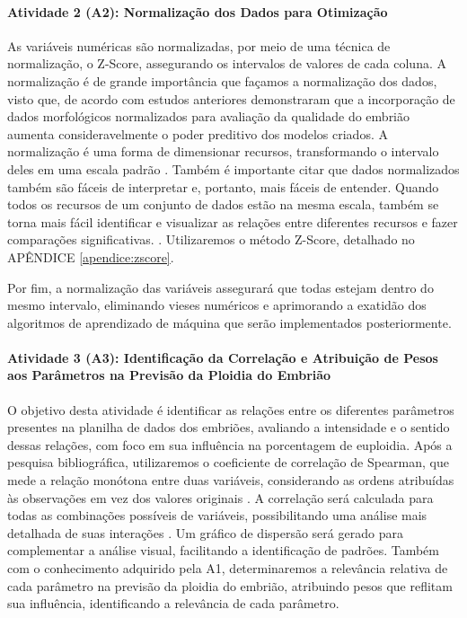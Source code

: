 \paragraph{\textbf{Atividade 2 (A2):} Normalização dos Dados para Otimização}

As variáveis numéricas são normalizadas, por meio de uma técnica de normalização, o Z-Score, assegurando os intervalos de valores de cada coluna. A normalização é de grande importância que façamos a normalização dos dados, visto que, de acordo com  estudos anteriores demonstraram que a incorporação de dados morfológicos normalizados para avaliação da qualidade do embrião aumenta consideravelmente o poder preditivo dos modelos criados. A normalização é uma forma de dimensionar recursos, transformando o intervalo deles em uma escala padrão \cite{jaiswal2024}. Também é importante citar que dados normalizados também são fáceis de interpretar e, portanto, mais fáceis de entender. Quando todos os recursos de um conjunto de dados estão na mesma escala, também se torna mais fácil identificar e visualizar as relações entre diferentes recursos e fazer comparações significativas. \cite{jaiswal2024}. Utilizaremos o método Z-Score, detalhado no APÊNDICE \ref{apendice:zscore}.

Por fim, a normalização das variáveis assegurará que todas estejam dentro do mesmo intervalo, eliminando vieses numéricos e aprimorando a exatidão dos algoritmos de aprendizado de máquina que serão implementados posteriormente.

\paragraph{\textbf{Atividade 3 (A3):} Identificação da Correlação e Atribuição de Pesos aos Parâmetros na Previsão da Ploidia do Embrião}

O objetivo desta atividade é identificar as relações entre os diferentes parâmetros presentes na planilha de dados dos embriões, avaliando a intensidade e o sentido dessas relações, com foco em sua influência na porcentagem de euploidia. Após a pesquisa bibliográfica, utilizaremos o coeficiente de correlação de Spearman, que mede a relação monótona entre duas variáveis, considerando as ordens atribuídas às observações em vez dos valores originais \cite{sousa2019}. A correlação será calculada para todas as combinações possíveis de variáveis, possibilitando uma análise mais detalhada de suas interações \cite{sousa2019}. Um gráfico de dispersão será gerado para complementar a análise visual, facilitando a identificação de padrões. Também com o conhecimento adquirido pela A1, determinaremos a relevância relativa de cada parâmetro na previsão da ploidia do embrião, atribuindo pesos que reflitam sua influência, identificando a relevância de cada parâmetro.

